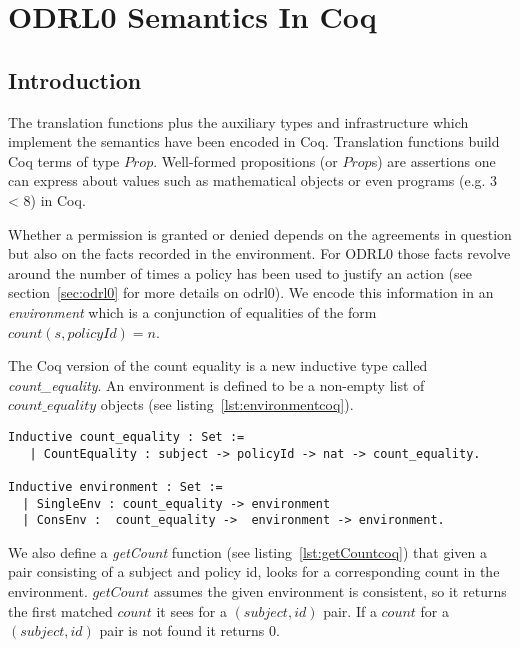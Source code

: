 \chapter{ODRL0 Semantics In Coq}


\section{Introduction}


The translation functions plus the auxiliary types and infrastructure which implement the semantics have been encoded in Coq. Translation functions build Coq terms of type $Prop$. Well-formed propositions (or $Prop$s) are assertions one can express about values such as mathematical objects or even programs (e.g. 3 < 8) in Coq. 

Whether a permission is granted or denied depends on the agreements in question but also on the facts recorded in the environment. For ODRL0 those facts revolve around the number of times a policy has been used to justify an action (see section~\ref{sec:odrl0} for more details on odrl0). We encode this information in an \emph{environment} which is a conjunction of equalities of the form $count(s, policyId) = n$. 

The Coq version of the count equality is a new inductive type called \emph{count_equality}. An environment is defined to be a non-empty list of $count\_equality$ objects (see listing~\ref{lst:environmentcoq}).

\begin{lstlisting}
Inductive count_equality : Set := 
   | CountEquality : subject -> policyId -> nat -> count_equality.

Inductive environment : Set := 
  | SingleEnv : count_equality -> environment
  | ConsEnv :  count_equality ->  environment -> environment.

\end{lstlisting}

We also define a \emph{getCount} function (see listing~\ref{lst:getCountcoq}) that given a pair consisting of a subject and policy id, looks for a corresponding count in the environment.
$getCount$ assumes the given environment is consistent, so it returns the first matched $count$ it sees for a $(subject, id)$ pair. If a $count$ for a $(subject, id)$ pair is not found it returns 0.

